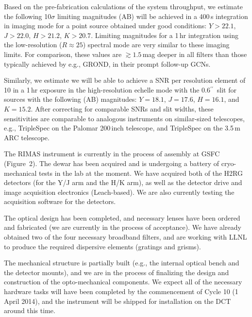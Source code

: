 \documentclass[letterpaper,11pt]{article}
\newcommand{\arcsec}{\mbox{$^{\prime\prime}$}}%
\begin{document}
\smallskip

Based on the pre-fabrication calculations of the system throughput, we estimate 
the following 10$\sigma$ limiting magnitudes (AB) will be achieved in a 400\,s
integration in imaging mode for a point source obtained under good 
conditions: $Y > 22.1$, $J > 22.0$, $H > 21.2$, $K > 20.7$.  Limiting
magnitudes for a 1\,hr integration using the low-resolution ($R \approx 25$)
spectral mode are very similar to these imaging limits.  For comparison, 
these values are $\gtrsim 1.5$\,mag deeper in all filters than those typically 
achieved by e.g., GROND, in their prompt follow-up GCNs.

Similarly, we estimate we will be able to achieve a SNR per resolution element of 
10 in a 1\,hr exposure in the high-resolution echelle mode with the 0.6\arcsec\ 
slit for sources with the following (AB) magnitudes: $Y = 18.1$, $J = 17.6$, 
$H = 16.1$, and $K = 15.2$.  After correcting for comparable SNRs and slit
widths, these sensitivities are comparable to analogous instruments on 
similar-sized telescopes, e.g., TripleSpec on the Palomar 200\,inch telescope, and
TripleSpec on the 3.5\,m ARC telescope.

\smallskip

The RIMAS instrument is currently in the process of assembly at GSFC (Figure~2).
The dewar has been acquired and is undergoing a battery of cryo-mechanical tests in
the lab at the moment.  We have acquired both of the H2RG detectors (for the Y/J 
arm and the H/K arm), as well as the detector drive and image acquisition electronics
(Leach-based).  We are also currently testing the acquisition software for the 
detectors.

The optical design has been completed, and necessary lenses have been ordered and
fabricated (we are currently in the process of acceptance).  We have already obtained
two of the four necessary broadband filters, and are working with LLNL to produce
the required dispersive elements (gratings and grisms).  

The mechanical structure is partially built (e.g., the internal optical bench and 
the detector mounts), and we are in the process of finalizing the design and
construction of the opto-mechanical components.  We expect all of the necessary 
hardware tasks will have been completed by the commencement of Cycle 10 (1 April 2014), 
and the instrument will be shipped for installation on the DCT around this time.
\end{document}
